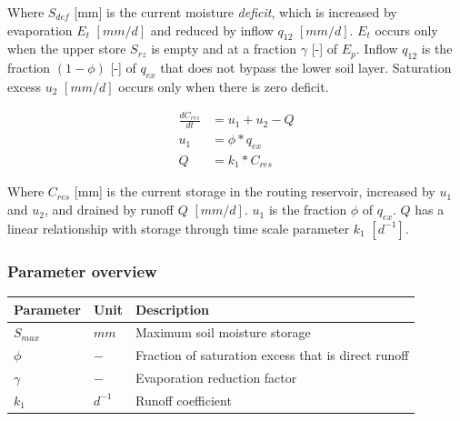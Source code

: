 Where $S_{def}$ [mm] is the current moisture \emph{deficit}, which is increased by evaporation $E_t$ $[mm/d]$ and reduced by inflow $q_{12}$ $[mm/d]$. 
$E_t$ occurs only when the upper store $S_{rz}$ is empty and at a fraction $\gamma$ [-] of $E_p$. 
Inflow $q_{12}$ is the fraction $(1-\phi)$ [-] of $q_{ex}$ that does not bypass the lower soil layer. 
Saturation excess $u_2$ $[mm/d]$ occurs only when there is zero deficit.

\begin{align}
	\frac{dC_{res}}{dt} &= u_1+u_2-Q\\
	u_1 &= \phi*q_{ex}\\
	Q &= k_1*C_{res}
\end{align}
  
Where $C_{res}$ [mm] is the current storage in the routing reservoir, increased by $u_1$ and $u_2$, and drained by runoff $Q$  $[mm/d]$. $u_1$ is the fraction $\phi$ of $q_{ex}$. $Q$ has a linear relationship with storage through time scale parameter $k_1$ $[d^{-1}]$.

\subsubsection{Parameter overview}

\begin{table}[htbp]
  \centering
    \begin{tabular}{lll}
    \toprule
    Parameter & Unit  & Description \\
    \midrule
    $S_{max}$ & $mm$  & Maximum soil moisture storage \\
    $\phi$ & $-$   & Fraction of saturation excess that is direct runoff \\
    $\gamma$ & $-$   & Evaporation reduction factor \\
    $k_1$ & $d^{-1}$ & Runoff coefficient \\
    \bottomrule
    \end{tabular}%
  \label{tab:addlabel}%
\end{table}%


